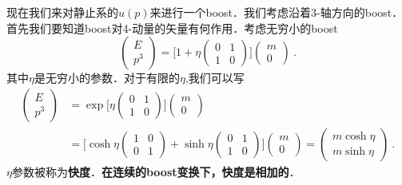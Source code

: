 现在我们来对静止系的$u(p)$来进行一个boost．我们考虑沿着3-轴方向的boost．首先我们要知道boost对4-动量的矢量有何作用．考虑无穷小的boost
\begin{equation}
\begin{pmatrix}
E \\ p^3
\end{pmatrix} = \bigg[ 1 + \eta \begin{pmatrix}
0 & 1 \\
1 & 0 
\end{pmatrix} \bigg] \begin{pmatrix}
m \\ 0
\end{pmatrix}~.
\end{equation}
其中$\eta$是无穷小的参数．对于有限的$\eta$,我们可以写
\begin{align}\nonumber
\begin{pmatrix}
E \\ p^3
\end{pmatrix} & = \exp \bigg[ \eta \begin{pmatrix}
0 & 1 \\
1& 0
\end{pmatrix} \bigg]\begin{pmatrix}
m \\ 0
\end{pmatrix} \\
& = \bigg[ \cosh \eta \begin{pmatrix}
1 & 0 \\ 0 & 1
\end{pmatrix} + \sinh \eta \begin{pmatrix}
0 & 1 \\
1 & 0
\end{pmatrix}\bigg]\begin{pmatrix}
m \\ 0
\end{pmatrix} = \begin{pmatrix}
m \cosh \eta \\ m \sinh \eta
\end{pmatrix}~.
\end{align}
$\eta$参数被称为\textbf{快度}．\textbf{在连续的boost变换下，快度是相加的}．

